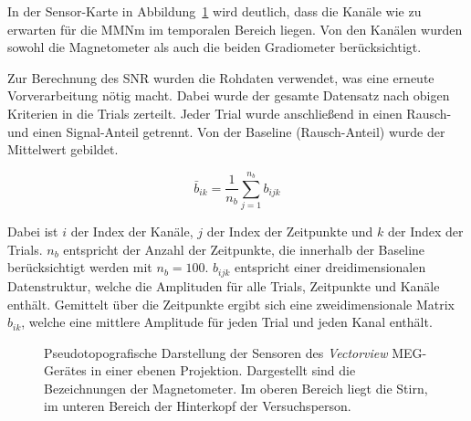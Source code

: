 \documentclass[doc,a4paper,12pt]{apa6}
\begin{document}
In der Sensor-Karte in Abbildung~\ref{img:sensmap} wird deutlich, dass die Kanäle wie zu erwarten für die MMNm im temporalen Bereich liegen. Von den Kanälen wurden sowohl die Magnetometer als auch die beiden Gradiometer berücksichtigt.

Zur Berechnung des SNR wurden die Rohdaten verwendet, was eine erneute Vorverarbeitung nötig macht. Dabei wurde der gesamte Datensatz nach obigen Kriterien in die Trials zerteilt. Jeder Trial wurde anschließend in einen Rausch- und einen Signal-Anteil getrennt. Von der Baseline (Rausch-Anteil) wurde der Mittelwert gebildet.

\begin{equation}
\bar{b}_{ik} = \frac{1}{n_b} \sum_{j=1}^{n_b} b_{ijk}
\end{equation}

Dabei ist $i$ der Index der Kanäle, $j$ der Index der Zeitpunkte und $k$ der Index der Trials. $n_b$ entspricht der Anzahl der Zeitpunkte, die innerhalb der Baseline berücksichtigt werden mit $n_b = 100$. $b_{ijk}$ entspricht einer dreidimensionalen Datenstruktur, welche die Amplituden für alle Trials, Zeitpunkte und Kanäle enthält. Gemittelt über die Zeitpunkte ergibt sich eine zweidimensionale Matrix $b_{ik}$, welche eine mittlere Amplitude für jeden Trial und jeden Kanal enthält.

\begin{figure}
  \centering
  \setlength{\fboxsep}{5mm}
  \vspace*{3mm}
  \caption[Pseudotopografische Darstellung der Sensoren des \emph{Vectorview} MEG-Gerätes]{Pseudotopografische Darstellung der Sensoren des \emph{Vectorview} MEG-Gerätes in einer ebenen Projektion. Dargestellt sind die Bezeichnungen der Magnetometer. Im oberen Bereich liegt die Stirn, im unteren Bereich der Hinterkopf der Versuchsperson.}
  \label{img:sensmap}
\end{figure}
\end{document}
